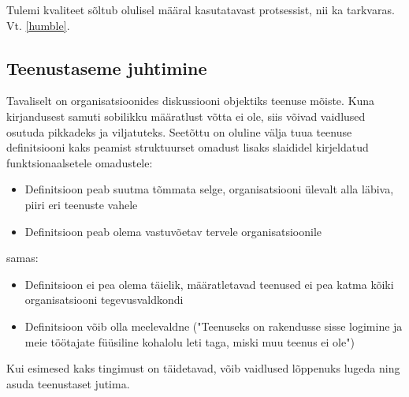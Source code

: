 \documentclass{article}
\begin{document}
Tulemi kvaliteet sõltub olulisel määral kasutatavast protsessist, nii ka tarkvaras. Vt. \ref{humble}.

\subsection{Teenustaseme juhtimine}
Tavaliselt on organisatsioonides diskussiooni objektiks teenuse mõiste. Kuna kirjandusest samuti sobilikku määratlust võtta ei ole, siis võivad vaidlused osutuda pikkadeks ja viljatuteks. Seetõttu on oluline välja tuua teenuse definitsiooni kaks peamist struktuurset omadust lisaks slaididel kirjeldatud funktsionaalsetele omadustele:
\begin{itemize}
	\item Definitsioon peab suutma tõmmata selge, organisatsiooni ülevalt alla läbiva, piiri eri teenuste vahele
	\item Definitsioon peab olema vastuvõetav tervele organisatsioonile
\end{itemize}

samas:
\begin{itemize}
	\item Definitsioon ei pea olema täielik, määratletavad teenused ei pea katma kõiki organisatsiooni tegevusvaldkondi
	\item Definitsioon võib olla meelevaldne ("Teenuseks on rakendusse sisse logimine ja meie töötajate füüsiline kohalolu leti taga, miski muu teenus ei ole")
\end{itemize}

Kui esimesed kaks tingimust on täidetavad, võib vaidlused lõppenuks lugeda ning asuda teenustaset jutima.




\nocite{*}

 
\end{document}
